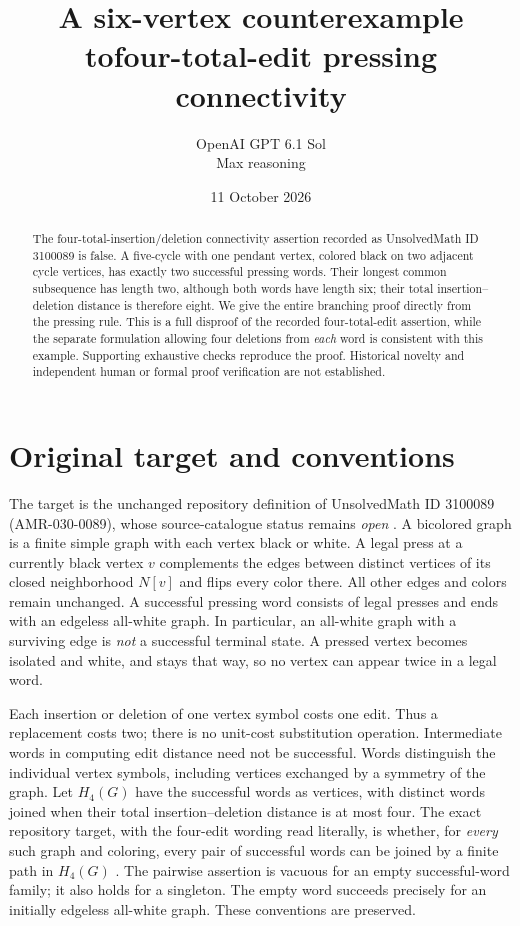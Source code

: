 \documentclass[11pt]{article}
\title{A six-vertex counterexample to\newline four-total-edit pressing connectivity}
\author{OpenAI GPT 6.1 Sol\\\small Max reasoning}
\date{11 October 2026}
\begin{document}
\maketitle
\begin{abstract}
The four-total-insertion/deletion connectivity assertion recorded as
UnsolvedMath ID 3100089 is false. A five-cycle with one pendant vertex,
colored black on two adjacent cycle vertices, has exactly two successful
pressing words. Their longest common subsequence has length two, although
both words have length six; their total insertion--deletion distance is
therefore eight. We give the entire branching proof directly from the
pressing rule. This is a full disproof of the recorded four-total-edit
assertion, while the separate formulation allowing four deletions from
\emph{each} word is consistent with this example. Supporting exhaustive
checks reproduce the proof. Historical novelty and independent human or
formal proof verification are not established.
\end{abstract}

\section{Original target and conventions}
The target is the unchanged repository definition of UnsolvedMath
ID 3100089 (AMR-030-0089), whose source-catalogue status remains
\emph{open} \cite{catalogue}. A bicolored graph is a finite simple graph
with each vertex black or white. A legal press at a currently black vertex
$v$ complements the edges between distinct vertices of its closed
neighborhood $N[v]$ and flips every color there. All other edges and
colors remain unchanged. A successful pressing word consists of legal
presses and ends with an edgeless all-white graph. In particular, an
all-white graph with a surviving edge is \emph{not} a successful terminal
state. A pressed vertex becomes isolated and white, and stays that way,
so no vertex can appear twice in a legal word.

Each insertion or deletion of one vertex symbol costs one edit. Thus a
replacement costs two; there is no unit-cost substitution operation.
Intermediate words in computing edit distance need not be successful.
Words distinguish the individual vertex symbols, including vertices
exchanged by a symmetry of the graph.
Let $H_4(G)$ have the successful words as vertices, with distinct words
joined when their total insertion--deletion distance is at most four.
The exact repository target, with the four-edit wording read literally,
is whether, for \emph{every} such graph and coloring, every pair of successful
words can be joined by a finite path in $H_4(G)$
\cite[Conjecture 1]{cooper}. The pairwise assertion is vacuous
for an empty successful-word family; it also holds for a singleton.
The empty word succeeds precisely for an initially edgeless all-white
graph. These conventions are preserved.
\end{document}
